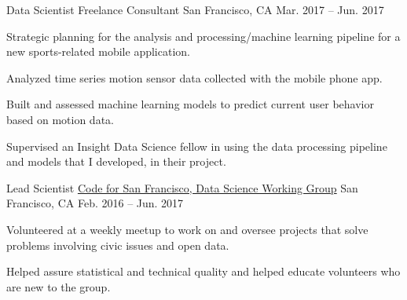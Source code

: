 \begin{cventries}
  \cventry
    {Data Scientist} %
    {Freelance Consultant} %
    {San Francisco, CA} %
    {Mar. 2017 -- Jun. 2017} %
    {
      \begin{cvitems} %
        \item {Strategic planning for the analysis and processing/machine learning pipeline for a new sports-related mobile application.}
        \item {Analyzed time series motion sensor data collected with the mobile phone app.}
        \item {Built and assessed machine learning models to predict current user behavior based on motion data.}
        \item {Supervised an Insight Data Science fellow in using the data processing pipeline and models that I developed, in their project.}
     \end{cvitems}
    }

  \cventry
    {Lead Scientist} %
    {\href{https://github.com/sfbrigade/data-science-wg}{Code for San Francisco, Data Science Working Group}} %
    {San Francisco, CA} %
    {Feb. 2016 -- Jun. 2017} %
    {
      \begin{cvitems} %
        \item {Volunteered at a weekly meetup to work on and oversee projects that solve problems involving civic issues and open data.}
        \item {Helped assure statistical and technical quality and helped educate volunteers who are new to the group.}
      \end{cvitems}
    }


\end{cventries}
